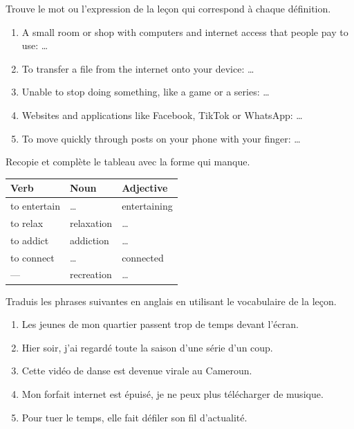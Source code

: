 \documentclass[11pt]{article}
\newcounter{popsec}
\newcounter{popsub}
\newcommand{\courssub}[1]{%
  \stepcounter{popsub}%
  \par\vspace{9pt}\noindent{\popxbold\fontsize{11.5}{13}\selectfont\color{popink}{\color{poporange}\thepopsec.\thepopsub}\hspace{6pt}#1}\par\nopagebreak\vspace{4pt}
}
\begin{document}
\begin{exercice}
Trouve le mot ou l'expression de la leçon qui correspond à chaque définition.
\begin{enumerate}
\item A small room or shop with computers and internet access that people pay to use: \ldots
\item To transfer a file from the internet onto your device: \ldots
\item Unable to stop doing something, like a game or a series: \ldots
\item Websites and applications like Facebook, TikTok or WhatsApp: \ldots
\item To move quickly through posts on your phone with your finger: \ldots
\end{enumerate}
\end{exercice}

\begin{exercice}
Recopie et complète le tableau avec la forme qui manque.
\begin{center}
\begin{tabular}{|l|l|l|}\hline
\rowcolor{popblueL} Verb & Noun & Adjective \\ \hline
to entertain & \ldots & entertaining \\ \hline
to relax & relaxation & \ldots \\ \hline
to addict & addiction & \ldots \\ \hline
to connect & \ldots & connected \\ \hline
--- & recreation & \ldots \\ \hline
\end{tabular}
\end{center}
\end{exercice}

\courssub{Je m'entraîne}

\begin{exercice}[Traduction]
Traduis les phrases suivantes en anglais en utilisant le vocabulaire de la leçon.
\begin{enumerate}
\item Les jeunes de mon quartier passent trop de temps devant l'écran.
\item Hier soir, j'ai regardé toute la saison d'une série d'un coup.
\item Cette vidéo de danse est devenue virale au Cameroun.
\item Mon forfait internet est épuisé, je ne peux plus télécharger de musique.
\item Pour tuer le temps, elle fait défiler son fil d'actualité.
\end{enumerate}
\end{exercice}
\end{document}
